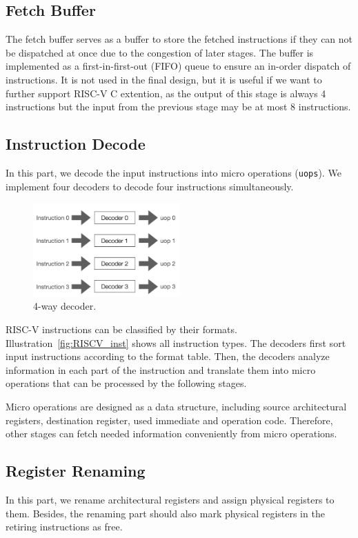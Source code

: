 \subsection{Fetch Buffer} %
The fetch buffer serves as a buffer to store the fetched instructions if they can not be dispatched at once due to the congestion of later stages. The buffer is implemented as a first-in-first-out (FIFO) queue to ensure an in-order dispatch of instructions. It is not used in the final design, but it is useful if we want to further support RISC-V C extention, as the output of this stage is always 4 instructions but the input from the previous stage may be at most 8 instructions.

\subsection{Instruction Decode} %
In this part, we decode the input instructions into micro operations (\texttt{uops}). We implement four decoders to decode four instructions simultaneously.

\begin{figure}[!htp]
    \centering
    \includegraphics[width=0.5\textwidth]{figure/decode.png}
    \caption{4-way decoder.}
    \label{fig:decoder}
\end{figure}

RISC-V instructions can be classified by their formats. Illustration~\ref{fig:RISCV_inst} shows all instruction types. The decoders first sort input instructions according to the format table. Then, the decoders analyze information in each part of the instruction and translate them into micro operations that can be processed by the following stages.

Micro operations are designed as a data structure, including source architectural registers, destination register, used immediate and operation code. Therefore, other stages can fetch needed information conveniently from micro operations.

\subsection{Register Renaming} %
In this part, we rename architectural registers and assign physical registers to them. Besides, the renaming part should also mark physical registers in the retiring instructions as free.

